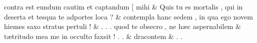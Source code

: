 \documentclass[12pt,onecolumn,twoside,a4paper]{memoir}
\begin{document}
\begin{pairs}
\begin{Leftside}
                              contra
                              est
                              eundum
                              cautim
                              et
                              captandum
                              [
                              mihi \&
                         \stanza {}
                     Quis
                              tu
                              es
                              mortalis
                              ,
                              qui
                              in
                              deserta
                              et
                              tesqua
                              te
                              adportes
                              loca
                              ? \&
                         \stanza {}
                     contempla
                              hanc
                              sedem
                              ,
                              in
                              qua
                              ego
                              novem
                              hiemes
                              saxo
                              stratus
                              pertuli
                              ! \&
                         \stanza {}.
                              .
                              .
                              quod
                              te
                              obsecro
                              ,
                              ne
                              hæc
                              aspernabilem & 
                     tætritudo
                              mea
                              me
                              in
                              occulto
                              faxsit
                              !
                              .
                              . \&
                         \stanza {}
                     dracontem \&
                         \stanza {}.
                              .

\end{Leftside}
\end{pairs}
\end{document}
